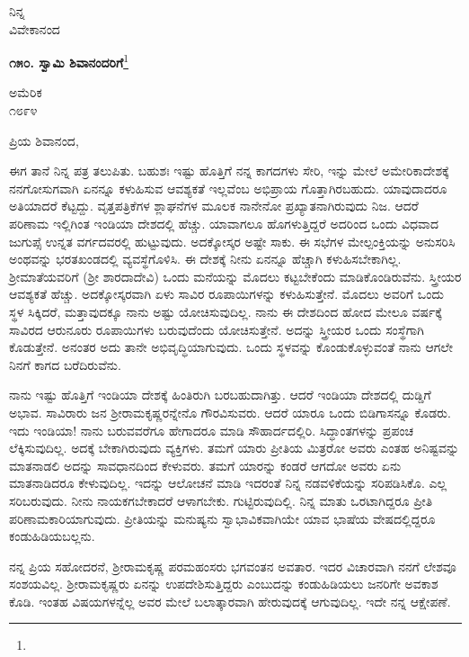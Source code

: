 {\flushright
ನಿನ್ನ\\ವಿವೇಕಾನಂದ\par}
\vspace{-0.3cm}
\begin{center}
\textbf{೧೫೦. ಸ್ವಾಮಿ ಶಿವಾನಂದರಿಗೆ}\footnote{}
\end{center}
\vspace{-0.6cm}

\begin{flushright}
ಅಮೆರಿಕ\\೧೮೯೪
\end{flushright}
\vspace{-0.5cm}

\noindent
ಪ್ರಿಯ ಶಿವಾನಂದ,

ಈಗ ತಾನೆ ನಿನ್ನ ಪತ್ರ ತಲುಪಿತು. ಬಹುಶಃ ಇಷ್ಟು ಹೊತ್ತಿಗೆ ನನ್ನ ಕಾಗದಗಳು ಸೇರಿ, ಇನ್ನು ಮೇಲೆ ಅಮೇರಿಕಾದೇಶಕ್ಕೆ ನನಗೋಸುಗವಾಗಿ ಏನನ್ನೂ ಕಳುಹಿಸುವ ಆವಶ್ಯಕತೆ ಇಲ್ಲವೆಂಬ ಅಭಿಪ್ರಾಯ ಗೊತ್ತಾಗಿರಬಹುದು. ಯಾವುದಾದರೂ ಅತಿಯಾದರೆ ಕೆಟ್ಟದ್ದು. ವೃತ್ತಪತ್ರಿಕೆಗಳ ಶ್ಲಾಘನೆಗಳ ಮೂಲಕ ನಾನೇನೋ ಪ್ರಖ್ಯಾತನಾಗಿರುವುದು ನಿಜ. ಆದರೆ ಪರಿಣಾಮ ಇಲ್ಲಿಗಿಂತ ಇಂಡಿಯಾ ದೇಶದಲ್ಲಿ ಹೆಚ್ಚು. ಯಾವಾಗಲೂ ಹೊಗಳುತ್ತಿದ್ದರೆ ಅದರಿಂದ ಒಂದು ವಿಧವಾದ ಜುಗುಪ್ಸೆ ಉನ್ನತ ವರ್ಗದವರಲ್ಲಿ ಹುಟ್ಟುವುದು. ಅದಕ್ಕೋಸ್ಕರ ಅಷ್ಟೇ ಸಾಕು. ಈ ಸಭೆಗಳ ಮೇಲ್ಪಂಕ್ತಿಯನ್ನು ಅನುಸರಿಸಿ ಅಂಥವನ್ನು ಭರತಖಂಡದಲ್ಲಿ ವ್ಯವಸ್ಥೆಗೊಳಿಸಿ. ಈ ದೇಶಕ್ಕೆ ನೀನು ಏನನ್ನೂ ಹೆಚ್ಚಾಗಿ ಕಳುಹಿಸಬೇಕಾಗಿಲ್ಲ. ಶ‍್ರೀಮಾತೆಯವರಿಗೆ (ಶ‍್ರೀ ಶಾರದಾದೇವಿ) ಒಂದು ಮನೆಯನ್ನು ಮೊದಲು ಕಟ್ಟಬೇಕೆಂದು ಮಾಡಿಕೊಂಡಿರುವೆನು. ಸ್ತ್ರೀಯರ ಆವಶ್ಯಕತೆ ಹೆಚ್ಚು. ಅದಕ್ಕೋಸ್ಕರವಾಗಿ ಏಳು ಸಾವಿರ ರೂಪಾಯಿಗಳನ್ನು ಕಳುಹಿಸುತ್ತೇನೆ. ಮೊದಲು ಅವರಿಗೆ ಒಂದು ಸ್ಥಳ ಸಿಕ್ಕಿದರೆ, ಮತ್ತಾವುದಕ್ಕೂ ನಾನು ಅಷ್ಟು ಯೋಚಿಸುವುದಿಲ್ಲ. ನಾನು ಈ ದೇಶದಿಂದ ಹೋದ ಮೇಲೂ ವರ್ಷಕ್ಕೆ ಸಾವಿರದ ಆರುನೂರು ರೂಪಾಯಿಗಳು ಬರುವುದೆಂದು ಯೋಚಿಸುತ್ತೇನೆ. ಅದನ್ನು ಸ್ತ್ರೀಯರ ಒಂದು ಸಂಸ್ಥೆಗಾಗಿ ಕೊಡುತ್ತೇನೆ. ಅನಂತರ ಅದು ತಾನೇ ಅಭಿವೃದ್ಧಿಯಾಗುವುದು. ಒಂದು ಸ್ಥಳವನ್ನು ಕೊಂಡುಕೊಳ್ಳುವಂತೆ ನಾನು ಆಗಲೇ ನಿನಗೆ ಕಾಗದ ಬರೆದಿರುವೆನು.

ನಾನು ಇಷ್ಟು ಹೊತ್ತಿಗೆ ಇಂಡಿಯಾ ದೇಶಕ್ಕೆ ಹಿಂತಿರುಗಿ ಬರಬಹುದಾಗಿತ್ತು. ಆದರೆ ಇಂಡಿಯಾ ದೇಶದಲ್ಲಿ ದುಡ್ಡಿಗೆ ಅಭಾವ. ಸಾವಿರಾರು ಜನ ಶ‍್ರೀರಾಮಕೃಷ್ಣರನ್ನೇನೊ ಗೌರವಿಸುವರು. ಆದರೆ ಯಾರೂ ಒಂದು ಬಿಡಿಗಾಸನ್ನೂ ಕೊಡರು. ಇದು ಇಂಡಿಯಾ! ನಾನು ಬರುವವರೆಗೂ ಹೇಗಾದರೂ ಮಾಡಿ ಸೌಹಾರ್ದದಲ್ಲಿರಿ. ಸಿದ್ಧಾಂತಗಳನ್ನು ಪ್ರಪಂಚ ಲೆಕ್ಕಿಸುವುದಿಲ್ಲ. ಅದಕ್ಕೆ ಬೇಕಾಗಿರುವುದು ವ್ಯಕ್ತಿಗಳು. ತಮಗೆ ಯಾರು ಪ್ರೀತಿಯ ಮಿತ್ರರೋ ಅವರು ಎಂತಹ ಅನಿಷ್ಟವನ್ನು ಮಾತನಾಡಲಿ ಅದನ್ನು ಸಾವಧಾನದಿಂದ ಕೇಳುವರು. ತಮಗೆ ಯಾರನ್ನು ಕಂಡರೆ ಆಗದೋ ಅವರು ಏನು ಮಾತನಾಡಿದರೂ ಕೇಳುವುದಿಲ್ಲ. ಇದನ್ನು ಆಲೋಚನೆ ಮಾಡಿ ಇದರಂತೆ ನಿನ್ನ ನಡವಳಿಕೆಯನ್ನು ಸರಿಪಡಿಸಿಕೊ. ಎಲ್ಲ ಸರಿಬರುವುದು. ನೀನು ನಾಯಕಗಬೇಕಾದರೆ ಆಳಾಗಬೇಕು. ಗುಟ್ಟಿರುವುದಿಲ್ಲಿ. ನಿನ್ನ ಮಾತು ಒರಟಾಗಿದ್ದರೂ ಪ್ರೀತಿ ಪರಿಣಾಮಕಾರಿಯಾಗುವುದು. ಪ್ರೀತಿಯನ್ನು ಮನುಷ್ಯನು ಸ್ವಾಭಾವಿಕವಾಗಿಯೇ ಯಾವ ಭಾಷೆಯ ವೇಷದಲ್ಲಿದ್ದರೂ ಕಂಡುಹಿಡಿಯಬಲ್ಲನು.

ನನ್ನ ಪ್ರಿಯ ಸಹೋದರನೆ, ಶ‍್ರೀರಾಮಕೃಷ್ಣ ಪರಮಹಂಸರು ಭಗವಂತನ ಅವತಾರ. ಇದರ ವಿಚಾರವಾಗಿ ನನಗೆ ಲೇಶವೂ ಸಂಶಯವಿಲ್ಲ. ಶ‍್ರೀರಾಮಕೃಷ್ಣರು ಏನನ್ನು ಉಪದೇಶಿಸುತ್ತಿದ್ದರು ಎಂಬುದನ್ನು ಕಂಡುಹಿಡಿಯಲು ಜನರಿಗೇ ಅವಕಾಶ ಕೊಡಿ. ಇಂತಹ ವಿಷಯಗಳನ್ನೆಲ್ಲ ಅವರ ಮೇಲೆ ಬಲಾತ್ಕಾರವಾಗಿ ಹೇರುವುದಕ್ಕೆ ಆಗುವುದಿಲ್ಲ. ಇದೇ ನನ್ನ ಆಕ್ಷೇಪಣೆ.


